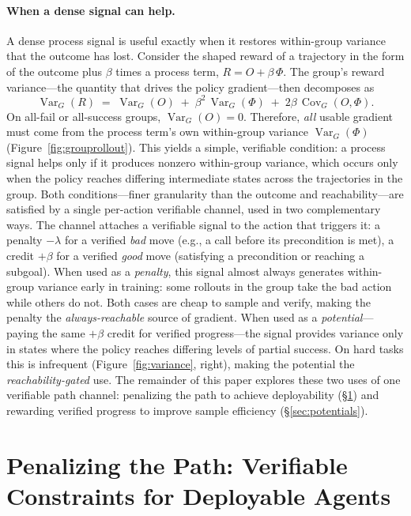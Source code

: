 \paragraph{When a dense signal can help.} A dense process signal is useful exactly when it restores within-group variance that the outcome has lost. Consider the shaped reward of a trajectory in the form of the outcome plus $\beta$ times a process term, $R = O + \beta\,\Phi$. The group's reward variance---the quantity that drives the policy gradient---then decomposes as
\begin{equation}
\operatorname{Var}_G(R) \;=\; \operatorname{Var}_G(O) \;+\; \beta^2\,\operatorname{Var}_G(\Phi) \;+\; 2\beta\,\operatorname{Cov}_G(O,\Phi).
\label{eq:vardecomp}
\end{equation}
On all-fail or all-success groups, $\operatorname{Var}_G(O) = 0$. Therefore, \emph{all} usable gradient must come from the process term's own within-group variance $\operatorname{Var}_G(\Phi)$ (Figure~\ref{fig:grouprollout}). This yields a simple, verifiable condition: a process signal helps only if it produces nonzero within-group variance, which occurs only when the policy reaches differing intermediate states across the trajectories in the group.
Both conditions---finer granularity than the outcome and reachability---are satisfied by a single per-action verifiable channel, used in two complementary ways. The channel attaches a verifiable signal to the action that triggers it: a penalty $-\lambda$ for a verified \emph{bad} move (e.g., a call before its precondition is met), a credit $+\beta$ for a verified \emph{good} move (satisfying a precondition or reaching a subgoal). When used as a \emph{penalty}, this signal almost always generates within-group variance early in training: some rollouts in the group take the bad action while others do not. Both cases are cheap to sample and verify, making the penalty the \emph{always-reachable} source of gradient. When used as a \emph{potential}---paying the same $+\beta$ credit for verified progress---the signal provides variance only in states where the policy reaches differing levels of partial success. On hard tasks this is infrequent (Figure~\ref{fig:variance}, right), making the potential the \emph{reachability-gated} use. The remainder of this paper explores these two uses of one verifiable path channel: penalizing the path to achieve deployability (\S\ref{sec:path}) and rewarding verified progress to improve sample efficiency (\S\ref{sec:potentials}).

\section{Penalizing the Path: Verifiable Constraints for Deployable Agents}
\label{sec:path}

